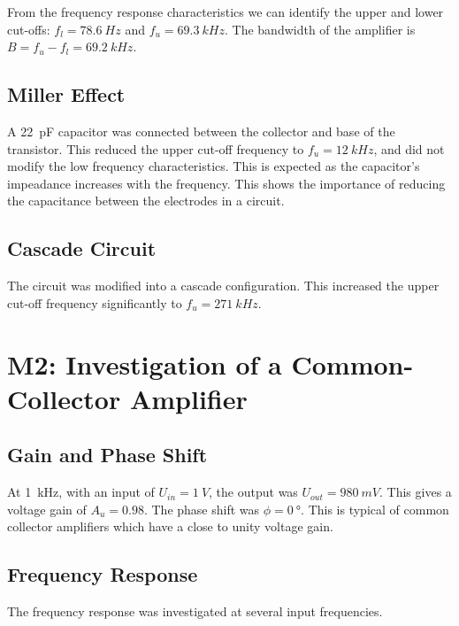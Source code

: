 \documentclass[12pt,a4paper]{article}
\begin{document}
From the frequency response characteristics we can identify the upper and lower cut-offs: $f_l = \SI{78.6}{Hz}$ and $f_u = \SI{69.3}{kHz}$. The bandwidth of the amplifier is $B = f_u - f_l = \SI{69.2}{kHz}$. 

\subsection{Miller Effect}
A \SI{22}{pF} capacitor was connected between the collector and base of the transistor. This reduced the upper cut-off frequency to $f_u = \SI{12}{kHz}$, and did not modify the low frequency characteristics. This is expected as the capacitor's impeadance increases with the frequency. This shows the importance of reducing the capacitance between the electrodes in a circuit.

\subsection{Cascade Circuit}
The circuit was modified into a cascade configuration. This increased the upper cut-off frequency significantly to $f_u = \SI{271}{kHz}$.

\section{M2: Investigation of a Common-Collector Amplifier}

\subsection{Gain and Phase Shift}
At \SI{1}{kHz}, with an input of $U_{in} = \SI{1}{V}$, the output was $U_{out} = \SI{980}{mV}$. This gives a voltage gain of $A_u = 0.98$. The phase shift was $\phi = \SI{0}{\degree}$. This is typical of common collector amplifiers which have a close to unity voltage gain.

\subsection{Frequency Response}
The frequency response was investigated at several input frequencies.
\end{document}
